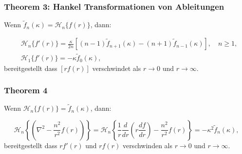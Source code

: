 \subsubsection{Theorem 3: Hankel Transformationen von Ableitungen \label{subsub:ableitungen}}
Wenn $\tilde{f}_n(\kappa)=\mathscr{H}_n\{f(r)\}$, dann:

\begin{align*}
	&\mathscr{H}_n\{f'(r)\}=\frac{\kappa}{2n}\left[(n-1)\tilde{f}_{n+1}(\kappa)-(n+1)\tilde{f}_{n-1}(\kappa)\right], \quad n\geq1, \\
	&\mathscr{H}_1\{f'(r)\}=-\kappa \tilde{f}_0(\kappa),
\end{align*}
bereitgestellt dass $[rf(r)]$ verschwindet als $r\to0$ und $r\to\infty$.

\subsubsection{Theorem 4 \label{subsub:thorem4}}
Wenn $\mathscr{H}_n\{f(r)\}=\tilde{f}_n(\kappa)$, dann:

\begin{equation*}
	\mathscr{H}_n \left\{ \left( \nabla^2 - \frac{n^2}{r^2} f(r)\right)\right\}= \mathscr{H}_n\left\{\frac{1}{r}\frac{d}{dr}\left(r\frac{df}{dr}\right) - \frac{n^2}{r^2}f(r)\right\}=-\kappa^2\tilde{f}_{n}(\kappa),
\end{equation*}
bereitgestellt dass $rf'(r)$ und $rf(r)$ verschwinden als $r\to0$ und $r\to\infty$.


